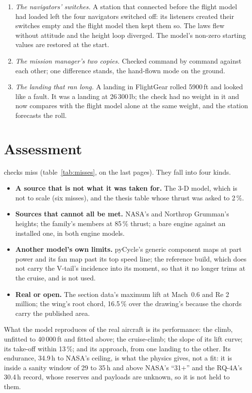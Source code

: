 \documentclass[10pt,a4paper,twocolumn]{article}
\begin{document}
\begin{enumerate}
\item \emph{The navigators' switches.} A station that connected before the flight model had loaded left the four navigators switched off: its
listeners created their switches empty and the flight model then kept them so. The laws flew without attitude and the height loop diverged. The model's
non-zero starting values are restored at the start.
\item \emph{The mission manager's two copies.} Checked command by command against each other; one difference stands, the hand-flown mode on the ground.
\item \emph{The landing that ran long.} A landing in FlightGear rolled 5900\,ft and looked like a fault. It was a landing at 26\,300\,lb; the check
had no weight in it and now compares with the flight model alone at the same weight, and the station forecasts the roll.
\end{enumerate}

\section{Assessment}\label{sec:assess}
\Nmiss{} checks miss (table~\ref{tab:misses}, on the last pages). They fall into four kinds.
\begin{itemize}
\item \textbf{A source that is not what it was taken for.} The 3-D model, which is not to scale (six misses), and the thesis table whose thrust was
asked to 2\,\%.
\item \textbf{Sources that cannot all be met.} NASA's and Northrop Grumman's heights; the family's members at 85\,\% thrust; a bare engine against an
installed one, in both engine models.
\item \textbf{Another model's own limits.} pyCycle's generic component maps at part power and its fan map past its top speed line; the reference
build, which does not carry the V-tail's incidence into its moment, so that it no longer trims at the cruise, and is not used.
\item \textbf{Real or open.} The section data's maximum lift at Mach~0.6 and Re 2 million; the wing's root chord, 16.5\,\%
over the drawing's because the chords carry the published area.
\end{itemize}
What the model reproduces of the real aircraft is its performance: the climb, unfitted to 40\,000\,ft and fitted above; the cruise-climb; the slope of
its lift curve; its take-off within 13\,\%; and its approach, from one landing to the other. Its endurance, 34.9\,h to NASA's ceiling, is what the
physics gives, not a fit: it is inside a sanity window of 29 to 35\,h and above NASA's ``31+'' and the RQ-4A's 30.4\,h record, whose reserves and payloads
are unknown, so it is not held to them.
\end{document}
